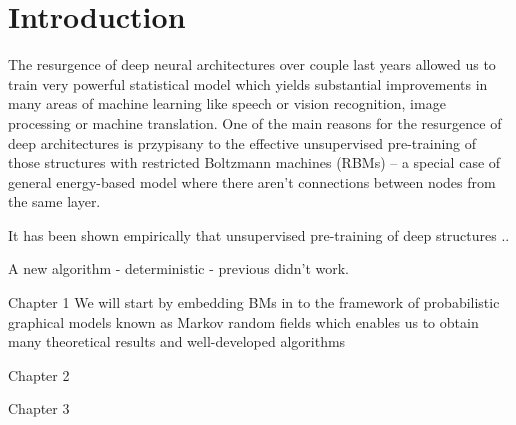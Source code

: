 \chapter{Introduction}
The resurgence of deep neural architectures over couple last years allowed us to train very powerful statistical model which yields substantial improvements in many areas of machine learning like speech or vision recognition, image processing or machine translation. One of the main reasons for the resurgence of deep architectures is przypisany to the effective unsupervised pre-training of those structures with restricted Boltzmann machines (RBMs) -- a special case of general energy-based model where there aren't connections between nodes from the same layer. 


It has been shown empirically that unsupervised pre-training of deep structures ..
\cite{erhan2010does}

A new algorithm - deterministic - previous didn't work.

Chapter 1
We will start by embedding BMs in to the framework of probabilistic graphical models known as Markov random fields which enables us to obtain many theoretical results and well-developed algorithms

Chapter 2

Chapter 3
